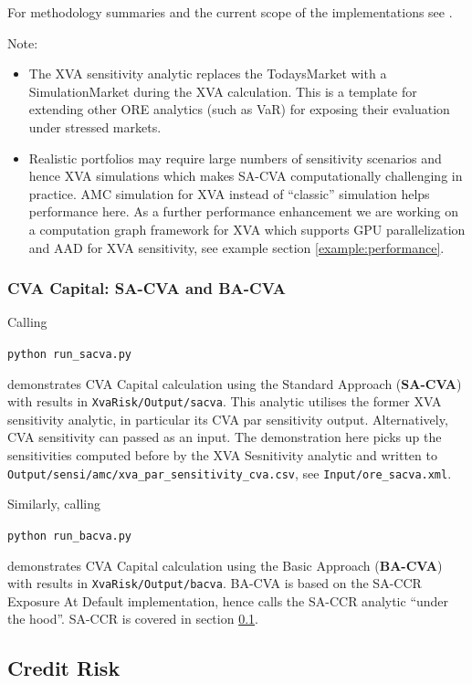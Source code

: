 For methodology summaries and the current scope of the implementations see \cite{methods}.

Note:
\begin{itemize}
\item The XVA sensitivity analytic replaces the TodaysMarket with a SimulationMarket during
  the XVA calculation. This is a template for extending other ORE analytics (such as VaR) for exposing
  their evaluation under stressed markets.
\item Realistic portfolios may require large numbers of sensitivity scenarios and hence XVA simulations
  which makes SA-CVA computationally challenging in practice. AMC simulation for XVA instead of ``classic''
  simulation helps performance here. As a further performance enhancement we are working on a computation
  graph framework for XVA which supports GPU parallelization and AAD for XVA sensitivity, see example
  section \ref{example:performance}.
\end{itemize}

\subsubsection{CVA Capital: SA-CVA and BA-CVA}\label{example:xvarisk_capital}

Calling

\medskip
\centerline {\tt python run\_sacva.py} 

\medskip
demonstrates CVA Capital calculation using the Standard Approach ({\bf SA-CVA}) with results in
{\tt XvaRisk/Output/sacva}. This analytic utilises the former XVA sensitivity analytic, in particular
its CVA par sensitivity output. Alternatively, CVA sensitivity can passed as an input. The
demonstration here picks up the sensitivities computed before by the XVA Sesnitivity analytic and
written to {\tt Output/sensi/amc/xva\_par\_sensitivity\_cva.csv}, see {\tt Input/ore\_sacva.xml}.

\medskip
Similarly, calling
\medskip
\centerline {\tt python run\_bacva.py} 

\medskip
demonstrates CVA Capital calculation using the Basic Approach ({\bf BA-CVA}) with results in
{\tt XvaRisk/Output/bacva}. BA-CVA is based on the SA-CCR Exposure At Default implementation,
hence calls the SA-CCR analytic ``under the hood''. SA-CCR is covered in section
\ref{example:creditrisk}. 

\subsection{Credit Risk}\label{example:creditrisk}

